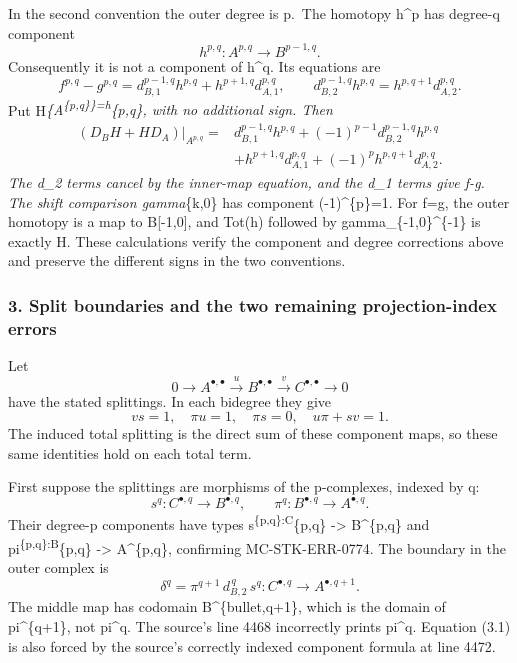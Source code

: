 \documentclass[11pt]{article}
\begin{document}
In the second convention the outer degree is p.~The homotopy h\^{}p has degree-q component \[
h^{p,q}:A^{p,q}\longrightarrow B^{p-1,q}.
\] Consequently it is not a component of h\^{}q. Its equations are \[
f^{p,q}-g^{p,q}
=d_{B,1}^{p-1,q}h^{p,q}+h^{p+1,q}d_{A,1}^{p,q},
\qquad
d_{B,2}^{p-1,q}h^{p,q}=h^{p,q+1}d_{A,2}^{p,q}.
\] Put H\textbar{}\emph{\{A\textsuperscript{\{p,q\}\}=h}\{p,q\}, with no additional sign. Then \[
\begin{aligned}
(D_BH+HD_A)|_{A^{p,q}}
={}&d_{B,1}^{p-1,q}h^{p,q}
 +(-1)^{p-1}d_{B,2}^{p-1,q}h^{p,q}\\
 &+h^{p+1,q}d_{A,1}^{p,q}
 +(-1)^p h^{p,q+1}d_{A,2}^{p,q}.
\end{aligned}
\] The d\_2 terms cancel by the inner-map equation, and the d\_1 terms give f-g. The shift comparison gamma}\{k,0\} has component (-1)\^{}\{p\}=1. For f=g, the outer homotopy is a map to B{[}-1,0{]}, and Tot(h) followed by gamma\_\{-1,0\}\^{}\{-1\} is exactly H. These calculations verify the component and degree corrections above and preserve the different signs in the two conventions.

\subsubsection{3. Split boundaries and the two remaining projection-index errors}\label{split-boundaries-and-the-two-remaining-projection-index-errors}

Let \[
0\longrightarrow A^{\bullet,\bullet}
\xrightarrow{u}B^{\bullet,\bullet}
\xrightarrow{v}C^{\bullet,\bullet}\longrightarrow0
\] have the stated splittings. In each bidegree they give \[
v s=1,\quad \pi u=1,\quad \pi s=0,\quad u\pi+s v=1.
\] The induced total splitting is the direct sum of these component maps, so these same identities hold on each total term.

First suppose the splittings are morphisms of the p-complexes, indexed by q: \[
s^q:C^{\bullet,q}\longrightarrow B^{\bullet,q},\qquad
\pi^q:B^{\bullet,q}\longrightarrow A^{\bullet,q}.
\] Their degree-p components have types s\textsuperscript{\{p,q\}:C}\{p,q\} -\textgreater{} B\^{}\{p,q\} and pi\textsuperscript{\{p,q\}:B}\{p,q\} -\textgreater{} A\^{}\{p,q\}, confirming MC-STK-ERR-0774. The boundary in the outer complex is \[
\boxed{\quad
\delta^q=\pi^{q+1}\,d_{B,2}^{\,q}\,s^q:
C^{\bullet,q}\longrightarrow A^{\bullet,q+1}.
\quad}                                                     \tag{3.1}
\] The middle map has codomain B\^{}\{bullet,q+1\}, which is the domain of pi\^{}\{q+1\}, not pi\^{}q. The source's line 4468 incorrectly prints pi\^{}q. Equation (3.1) is also forced by the source's correctly indexed component formula at line 4472.
\end{document}
